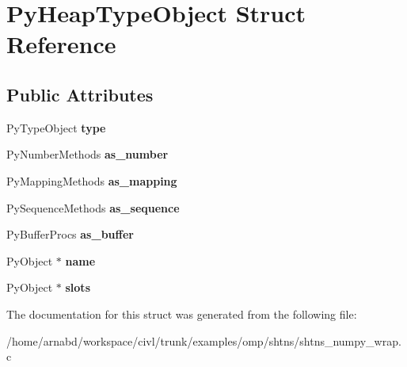\hypertarget{structPyHeapTypeObject}{}\section{Py\+Heap\+Type\+Object Struct Reference}
\label{structPyHeapTypeObject}
\subsection*{Public Attributes}
\begin{DoxyCompactItemize}
\item 
\hypertarget{structPyHeapTypeObject_a8b961137de4ebeed5a5d2e4b47ee1ca7}{}Py\+Type\+Object {\bfseries type}\label{structPyHeapTypeObject_a8b961137de4ebeed5a5d2e4b47ee1ca7}

\item 
\hypertarget{structPyHeapTypeObject_a795de378df40d11321c0dbe463759560}{}Py\+Number\+Methods {\bfseries as\+\_\+number}\label{structPyHeapTypeObject_a795de378df40d11321c0dbe463759560}

\item 
\hypertarget{structPyHeapTypeObject_a3112d193aea288a92036360bec1ce0a5}{}Py\+Mapping\+Methods {\bfseries as\+\_\+mapping}\label{structPyHeapTypeObject_a3112d193aea288a92036360bec1ce0a5}

\item 
\hypertarget{structPyHeapTypeObject_ad553caad5da3a7004aae1b7ac0289f12}{}Py\+Sequence\+Methods {\bfseries as\+\_\+sequence}\label{structPyHeapTypeObject_ad553caad5da3a7004aae1b7ac0289f12}

\item 
\hypertarget{structPyHeapTypeObject_a026c64b0a5163ea580e79640ecf209de}{}Py\+Buffer\+Procs {\bfseries as\+\_\+buffer}\label{structPyHeapTypeObject_a026c64b0a5163ea580e79640ecf209de}

\item 
\hypertarget{structPyHeapTypeObject_a5440c0413b3c519d996119695c957c80}{}Py\+Object $\ast$ {\bfseries name}\label{structPyHeapTypeObject_a5440c0413b3c519d996119695c957c80}

\item 
\hypertarget{structPyHeapTypeObject_a15212a8f85d939b3f4b133ecda1b62e5}{}Py\+Object $\ast$ {\bfseries slots}\label{structPyHeapTypeObject_a15212a8f85d939b3f4b133ecda1b62e5}

\end{DoxyCompactItemize}


The documentation for this struct was generated from the following file\+:\begin{DoxyCompactItemize}
\item 
/home/arnabd/workspace/civl/trunk/examples/omp/shtns/shtns\+\_\+numpy\+\_\+wrap.\+c\end{DoxyCompactItemize}
